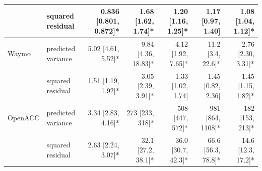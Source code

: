 \begin{table}[htbp]
\begin{tabular}{llrrrrr}
 & squared residual & 0.836 [0.801, 0.872]* & 1.68 [1.62, 1.74]* & 1.20 [1.16, 1.25]* & 1.17 [0.97, 1.40] & 1.08 [1.04, 1.12]* \\
\midrule
Waymo & predicted variance & 5.02 [4.61, 5.52]* & 9.84 [4.36, 18.83]* & 4.12 [1.92, 7.65]* & 11.2 [3.4, 22.6]* & 2.76 [2.30, 3.31]* \\
 & squared residual & 1.51 [1.19, 1.92]* & 3.05 [2.39, 3.91]* & 1.33 [1.02, 1.74] & 1.45 [0.82, 2.36] & 1.45 [1.15, 1.82]* \\
\midrule
OpenACC & predicted variance & 3.34 [2.83, 4.16]* & 273 [233, 318]* & 508 [447, 572]* & 981 [864, 1108]* & 182 [153, 213]* \\
 & squared residual & 2.63 [2.24, 3.07]* & 32.1 [27.2, 38.1]* & 36.0 [30.7, 42.3]* & 66.6 [56.3, 78.8]* & 14.6 [12.3, 17.2]* \\
\bottomrule
\end{tabular}
\end{table}
